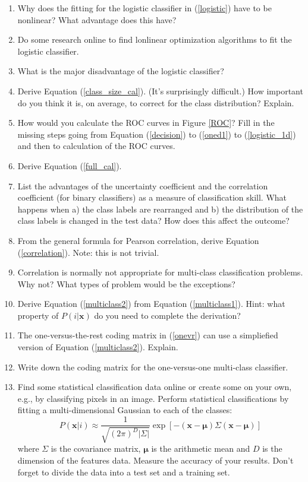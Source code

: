 \documentclass{article}
\renewcommand{\vec}[1]{\boldsymbol{#1}}
\begin{document}
\begin{enumerate}
	\item Why does the fitting for the logistic classifier in (\ref{logistic}) have to be nonlinear? What advantage does this have?
	\item Do some research online to find lonlinear optimization algorithms to fit the logistic classifier.
	\item What is the major disadvantage of the logistic classifier?
	\item Derive Equation (\ref{class_size_cal}). (It's surprisingly difficult.) How important do you think it is, on average, to correct for the class distribution? Explain.
	\item How would you calculate the ROC curves in Figure \ref{ROC}? Fill in the missing steps going from Equation (\ref{decision}) to (\ref{oned1}) to (\ref{logistic_1d}) and then to calculation of the ROC curves.
	\item Derive Equation (\ref{full_cal}).
	\item List the advantages of the uncertainty coefficient and the correlation coefficient (for binary classifiers) as a measure of classification skill.
	What happens when 
	a) the class labels are rearranged and 
	b) the distribution of the class labels is changed in the test data? 
	How does this affect the outcome?
	\item From the general formula for Pearson correlation, derive Equation (\ref{correlation}). Note: this is not trivial.
	\item Correlation is normally not appropriate for multi-class classification problems. Why not? What types of problem would be the exceptions?
	\item Derive Equation (\ref{multiclass2}) from Equation (\ref{multiclass1}). 
	Hint: what property of $P(i|\vec x)$ do you need to complete the derivation?
	\item The one-versus-the-rest coding matrix in (\ref{onevr}) can use a simpliefied version of Equation (\ref{multiclass2}). Explain.
	\item Write down the coding matrix for the one-versus-one multi-class classifier.
	\item Find some statistical classification data online or create some on your own, e.g., by classifying pixels in an image.
		Perform statistical classifications by fitting a multi-dimensional Gaussian to each of the classes:
		\begin{equation}
			P(\vec x | i) \approx \frac{1}{\sqrt{(2 \pi)^D |\Sigma|}}
				\exp \left [ - (\vec x - \vec \mu) \Sigma (\vec x - \vec \mu) \right ]
			\end{equation}
			where $\Sigma$ is the covariance matrix, $\vec \mu$ is the arithmetic mean and $D$ is the dimension of the features data. Measure the accuracy of your results. Don't forget to divide the data into a test set and a training set.
\end{enumerate}
\end{document}
